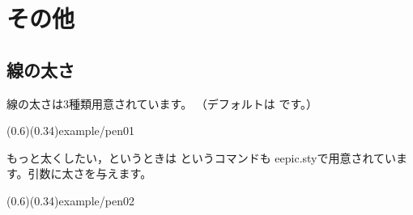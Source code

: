 \section{その他}
\subsection{線の太さ}
線の太さは3種類用意されています。
（デフォルトは  です。）

\showexample[線の太さ](0.6)(0.34){example/pen01}

もっと太くしたい，というときは  というコマンドも
\textsf{eepic.sty}で用意されています。引数に太さを与えます。

(0.6)(0.34){example/pen02}
